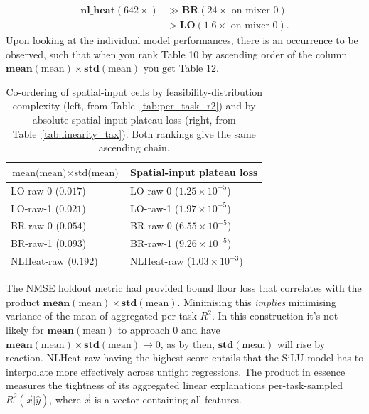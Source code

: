 \documentclass[10pt,journal,compsoc]{IEEEtran}
\begin{document}
\begin{align*}
\mathbf{nl\_heat} (642\times) &\gg \mathbf{BR} (24\times \text{ on mixer 0}) \\
&> \mathbf{LO} (1.6\times \text{ on mixer 0}).
\end{align*}
Upon looking at the individual model performances, there is an occurrence to be
observed, such that when you rank Table 10 by ascending order of the column
$\mathbf{mean}(\text{mean}) \times \mathbf{std}(\text{mean})$ you get Table 12.

\begin{table}[!t]
\centering
\caption{Co-ordering of spatial-input cells by
feasibility-distribution complexity (left, from
Table~\ref{tab:per_task_r2}) and by absolute spatial-input plateau
loss (right, from Table~\ref{tab:linearity_tax}). Both rankings give
the same ascending chain.}
\label{tab:tax_co_ordering}
\small
\begin{tabular}{@{}ll@{}}
\toprule
$\text{mean(mean)}\times\text{std(mean)}$ & Spatial-input plateau loss \\
\midrule
LO-raw-0 ($0.017$)        & LO-raw-0 ($1.25{\times}10^{-5}$) \\
LO-raw-1 ($0.021$)        & LO-raw-1 ($1.97{\times}10^{-5}$) \\
BR-raw-0 ($0.054$)        & BR-raw-0 ($6.55{\times}10^{-5}$) \\
BR-raw-1 ($0.093$)        & BR-raw-1 ($9.26{\times}10^{-5}$) \\
NLHeat-raw ($0.192$)      & NLHeat-raw ($1.03{\times}10^{-3}$) \\
\bottomrule
\end{tabular}
\end{table}

The NMSE holdout metric had provided bound floor loss that correlates with the
product $\mathbf{mean}(\text{mean}) \times \mathbf{std}(\text{mean})$.
Minimising this \emph{implies} minimising variance of the mean of aggregated per-task
$R^2$. In this construction it's not likely for $\mathbf{mean}(\text{mean})$ to
approach $0$ and have $\mathbf{mean}(\text{mean})\times\mathbf{std}(\text{mean})
\to 0$, as by then, $\mathbf{std}(\text{mean})$ will rise by reaction. NLHeat raw
having the highest score entails that the SiLU model has to interpolate more
effectively across untight regressions. The product in essence measures the
tightness of its aggregated linear explanations per-task-sampled $R^2(\vec{x}|\hat{y})$, 
where $\vec{x}$ is a vector containing all features.
\end{document}
